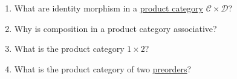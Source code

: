 \begin{enumerate}
    \item What are identity morphism in a \href{doc/1 math/Seven Sketches in Compositionality/Chapter 3: Databases/5 Introduction to limits and colimits/1 Terminal objects and products/5 Product in Cat}{product category} $\mathcal{C}\times \mathcal{D}$?
    \item Why is composition in a product category associative?
    \item What is the product category $1 \times 2$?
    \item What is the product category of two \href{doc/1 math/Seven Sketches in Compositionality/Chapter 1: Generative Effects/3 Preorders/1 Preorder}{preorders}?
  \end{enumerate}